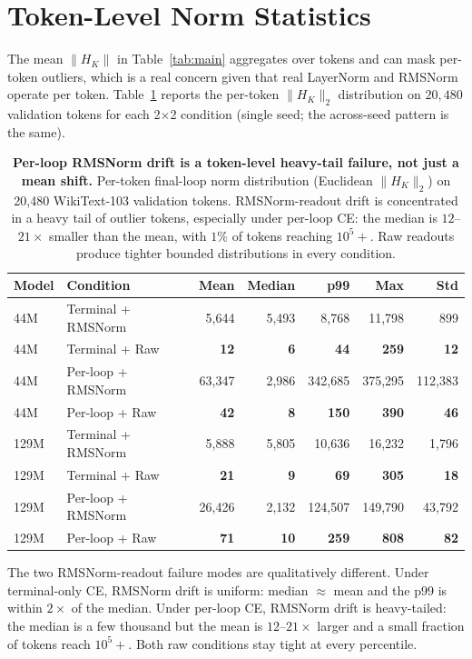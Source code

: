\section{Token-Level Norm Statistics}
\label{app:per-token-norms}

The mean $\|H_K\|$ in Table~\ref{tab:main} aggregates over tokens and can mask per-token outliers, which is a real concern given that real LayerNorm and RMSNorm operate per token.
Table~\ref{tab:per-token} reports the per-token $\|H_K\|_2$ distribution on $20{,}480$ validation tokens for each 2$\times$2 condition (single seed; the across-seed pattern is the same).

\begin{table}[h]
\centering
\small
\caption{\textbf{Per-loop RMSNorm drift is a token-level heavy-tail failure, not just a mean shift.} Per-token final-loop norm distribution (Euclidean $\|H_K\|_2$) on 20,480 WikiText-103 validation tokens. RMSNorm-readout drift is concentrated in a heavy tail of outlier tokens, especially under per-loop CE: the median is $12$--$21\times$ smaller than the mean, with $1\%$ of tokens reaching $10^5{+}$. Raw readouts produce tighter bounded distributions in every condition.}
\label{tab:per-token}
\begin{tabular}{llrrrrr}
\toprule
\textbf{Model} & \textbf{Condition} & \textbf{Mean} & \textbf{Median} & \textbf{p99} & \textbf{Max} & \textbf{Std} \\
\midrule
44M  & Terminal + RMSNorm & 5{,}644 & 5{,}493 & 8{,}768 & 11{,}798 & 899 \\
44M  & Terminal + Raw     & \textbf{12} & \textbf{6} & \textbf{44} & \textbf{259} & \textbf{12} \\
44M  & Per-loop + RMSNorm & 63{,}347 & 2{,}986 & 342{,}685 & 375{,}295 & 112{,}383 \\
44M  & Per-loop + Raw     & \textbf{42} & \textbf{8} & \textbf{150} & \textbf{390} & \textbf{46} \\
\midrule
129M & Terminal + RMSNorm & 5{,}888 & 5{,}805 & 10{,}636 & 16{,}232 & 1{,}796 \\
129M & Terminal + Raw     & \textbf{21} & \textbf{9} & \textbf{69} & \textbf{305} & \textbf{18} \\
129M & Per-loop + RMSNorm & 26{,}426 & 2{,}132 & 124{,}507 & 149{,}790 & 43{,}792 \\
129M & Per-loop + Raw     & \textbf{71} & \textbf{10} & \textbf{259} & \textbf{808} & \textbf{82} \\
\bottomrule
\end{tabular}
\end{table}

The two RMSNorm-readout failure modes are qualitatively different.
Under terminal-only CE, RMSNorm drift is uniform: median $\approx$ mean and the p99 is within $2\times$ of the median.
Under per-loop CE, RMSNorm drift is heavy-tailed: the median is a few thousand but the mean is $12$--$21\times$ larger and a small fraction of tokens reach $10^5{+}$.
Both raw conditions stay tight at every percentile.

